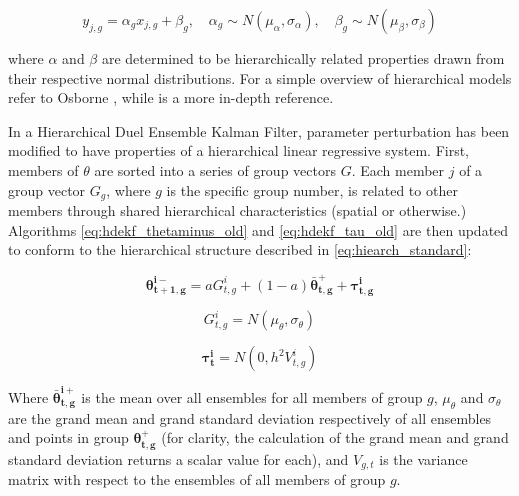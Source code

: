 \begin{equation}\label{eq:hiearch_standard}
y_{j,g} = \alpha_{g} x_{j,g} + \beta_{g}, \quad \alpha_{g} \sim N( \mu_{\alpha}, \sigma_{\alpha} ), \quad \beta_{g} \sim N( \mu_{\beta} , \sigma_{\beta} )
\end{equation}

where $\alpha$ and $\beta$ are determined to be hierarchically related properties drawn from their respective normal distributions. For a simple overview of hierarchical models refer to Osborne \cite{Osborne2000}, while \cite{Gelman2013} is a more in-depth reference.

In a Hierarchical Duel Ensemble Kalman Filter, parameter perturbation has been modified to have properties of a hierarchical linear regressive system. First, members of $\theta$ are sorted into a series of group vectors $G$. Each member $j$ of a group vector $G_{g}$, where $g$ is the specific group number, is related to other members through shared hierarchical characteristics (spatial or otherwise.) Algorithms \eqref{eq:hdekf_thetaminus_old} and \eqref{eq:hdekf_tau_old} are then updated to conform to the hierarchical structure described in \eqref{eq:hiearch_standard}:

\begin{equation}\label{eq:hdekf_theta}
\mathbf{\theta_{t+1,g}^{i-}} = a G_{t,g}^{i} + (1-a)\mathbf{\bar{\theta}_{t,g}^{+}} + \mathbf{\tau_{t,g}^{i}}
\end{equation}


\begin{equation}\label{eq:hdekf_tau}
G_{t,g}^{i} = N( \mu_{\theta}, \sigma_{\theta} )
\end{equation}

\begin{equation}\label{eq:hdekf_tau}
\mathbf{\tau_{t}^{i}} = N(0, h^{2}V_{t,g}^{i})
\end{equation}


Where $\mathbf{\bar{\theta}_{t,g}^{i+}}$ is the mean over all ensembles for all members of group $g$, $\mu_{\theta}$ and $\sigma_{\theta}$ are the grand mean and grand standard deviation respectively of all ensembles and points in group $\mathbf{\theta_{t,g}^{+}}$ (for clarity, the calculation of the grand mean and grand standard deviation returns a scalar value for each), and $V_{g,t}$ is the variance matrix with respect to the ensembles of all members of group $g$.

